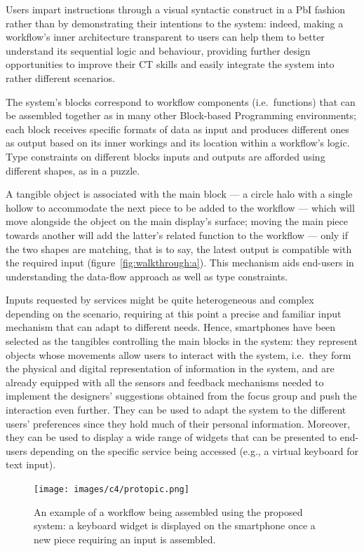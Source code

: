 Users impart instructions through a visual syntactic construct in a \ac{PbI} fashion rather than by demonstrating their intentions to the system: indeed, making a workflow's inner architecture transparent to users can help them to better understand its sequential logic and behaviour, providing further design opportunities to improve their \ac{CT} skills and easily integrate the system into rather different scenarios.

The system's blocks correspond to workflow components (i.e.\ functions) that can be assembled together as in many other Block-based Programming environments; each block receives specific formats of data as input and produces different ones as output based on its inner workings and its location within a workflow's logic. Type constraints on different blocks inputs and outputs are afforded using different shapes, as in a puzzle.

A tangible object is associated with the main block --- a circle halo with a single hollow to accommodate the next piece to be added to the workflow --- which will move alongside the object on the main display's surface; moving the main piece towards another will add the latter's related function to the workflow --- only if the two shapes are matching, that is to say, the latest output is compatible with the required input (figure~\ref{fig:walkthrough:a}). This mechanism aids end-users in understanding the data-flow approach as well as type constraints.

Inputs requested by services might be quite heterogeneous and complex depending on the scenario, requiring at this point a precise and familiar input mechanism that can adapt to different needs. Hence, smartphones have been se\-lect\-ed as the tan\-gi\-bles controlling the main blocks in the system: they represent objects whose movements allow users to interact with the system, i.e.\ they form the physical and digital representation of information in the system, and are already equipped with all the sensors and feedback mechanisms needed to implement the designers' suggestions obtained from the focus group and push the interaction even further. They can be used to adapt the system to the different users' preferences since they hold much of their personal information. Moreover, they can be used to display a wide range of widgets that can be presented to end-users depending on the specific service being accessed (e.g., a virtual keyboard for text input).

\begin{figure}[ht!]
\centering
\texttt{[image: images/c4/protopic.png]}
\caption{An example of a workflow being assembled using the proposed system: a keyboard widget is displayed on the smartphone once a new piece requiring an input is assembled.}\label{fig:proto}
\end{figure}

